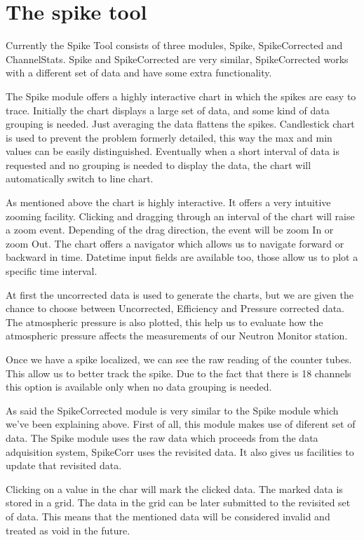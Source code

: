 \documentclass[a4paper]{jpconf}
\begin{document}
\section{The spike tool}
Currently the Spike Tool consists of three modules, Spike, SpikeCorrected and ChannelStats. Spike and SpikeCorrected are very similar, 
SpikeCorrected works with a different set of data and have some extra functionality.

The Spike module offers a highly interactive chart in which the spikes are easy to trace. Initially the chart displays a large set of
data, and some kind of data grouping is needed. Just averaging the data flattens the spikes. Candlestick chart is used to prevent the
problem formerly detailed, this way the max and min values can be easily distinguished. Eventually when a short interval of data is 
requested and no grouping is needed to display the data, the chart will automatically switch to line chart.

As mentioned above the chart is highly interactive. It offers a very intuitive zooming facility. Clicking and dragging through an 
interval of the chart will raise a zoom event. Depending of the drag direction, the event will be zoom In or zoom Out. The chart 
offers a navigator which allows us to navigate forward or backward in time. Datetime input fields are available too, those allow 
us to plot a specific time interval.

At first the uncorrected data is used to generate the charts, but we are given the chance to choose between Uncorrected, Efficiency
and Pressure corrected data. The atmospheric pressure is also plotted, this help us to evaluate how the atmospheric pressure affects
the measurements of our Neutron Monitor station.

Once we have a spike localized, we can see the raw reading of the counter tubes. This allow us to better track the spike. Due to the
fact that there is 18 channels this option is available only when no data grouping is needed.

As said the SpikeCorrected module is very similar to the Spike module which we've been explaining above. First of all, this module 
makes use of diferent set of data. The Spike module uses the raw data which proceeds from the data adquisition system, SpikeCorr uses 
the revisited data. It also gives us facilities to update that revisited data.

Clicking on a value in the char will mark the clicked data. The marked data is stored in a grid. The data in the grid can be later
submitted to the revisited set of data. This means that the mentioned data will be considered invalid and treated as void in the future.
\end{document}
